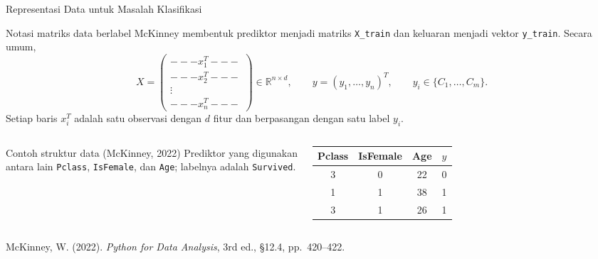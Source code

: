\documentclass[aspectratio=169,11pt]{beamer}
\begin{document}
\begin{frame}{Representasi Data untuk Masalah Klasifikasi}
\begin{block}{Notasi matriks data berlabel}
\small
McKinney membentuk prediktor menjadi matriks \texttt{X\_train} dan keluaran
menjadi vektor \texttt{y\_train}. Secara umum,
\[
X=
\begin{pmatrix}
---x_1^T---\\[-1mm]
---x_2^T---\\[-1mm]
\vdots\\[-1mm]
---x_n^T---
\end{pmatrix}
\in\mathbb{R}^{n\times d},
\qquad
y=(y_1,\ldots,y_n)^T,
\qquad
y_i\in\{C_1,\ldots,C_m\}.
\]
Setiap baris $x_i^T$ adalah satu observasi dengan $d$ fitur dan berpasangan
dengan satu label $y_i$.
\end{block}

\begin{columns}[T]
\begin{block}{Contoh struktur data (McKinney, 2022)}
\footnotesize
Prediktor yang digunakan antara lain \texttt{Pclass}, \texttt{IsFemale}, dan
\texttt{Age}; labelnya adalah \texttt{Survived}.
\end{block}

\centering
\scriptsize
\begin{tabular}{c c c|c}
\toprule
Pclass & IsFemale & Age & $y$ \\
\midrule
3 & 0 & 22 & 0 \\
1 & 1 & 38 & 1 \\
3 & 1 & 26 & 1 \\
\bottomrule
\end{tabular}
\end{columns}

\vfill
{\tiny McKinney, W. (2022). \textit{Python for Data Analysis}, 3rd ed.,
\S12.4, pp.~420--422.}
\end{frame}
\end{document}
